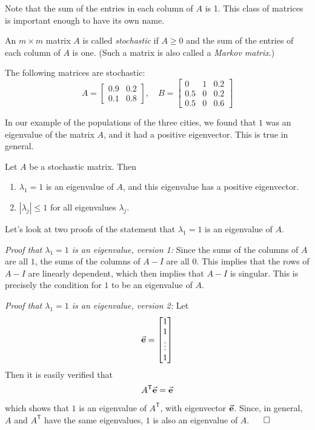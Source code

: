 Note that the sum of the entries in each column of $A$ is 1.
This class of matrices is important enough to have its own name.
\begin{definition}
An $m\times m$ matrix $A$ is called \emph{stochastic}
if $A \ge 0$ and the sum of the entries
of each column of $A$ is one.
(Such a matrix is also called a \emph{Markov matrix}.)
\end{definition}
\begin{xexample}
The following matrices are stochastic:
\begin{equation}
  A = \begin{bmatrix}
          0.9 & 0.2 \\ 0.1 & 0.8
      \end{bmatrix},
  \quad
  B = \begin{bmatrix}
          0 & 1 & 0.2 \\ 0.5 & 0 & 0.2 \\ 0.5 & 0 & 0.6
      \end{bmatrix}
\label{eqn:stoch:examples}
\end{equation}
\end{xexample}
In our example of the populations of the three cities,
we found that $1$ was an eigenvalue of the matrix $A$, and it
had a positive eigenvector.  This is true in general.
\begin{theorem}
Let $A$ be a stochastic matrix. Then
\begin{enumerate}
\item $\lambda_1 = 1$ is an eigenvalue of $A$,
and this eigenvalue has a positive eigenvector.
\item $|\lambda_j| \le 1$ for all eigenvalues $\lambda_j$.
\end{enumerate}
\end{theorem}
%
Let's look at two proofs of the statement that
$\lambda_1=1$ is an eigenvalue of $A$.

\emph{Proof that $\lambda_1=1$ is an eigenvalue, version 1:}
Since the sums of the columns of $A$ are all $1$,
the sums of the columns of $A-I$ are all $0$.
This implies that the rows of $A-I$ are linearly
dependent, which then implies that
$A-I$ is singular.  This is precisely the condition
for $1$ to be an eigenvalue of $A$.

\emph{Proof that $\lambda_1=1$ is an eigenvalue, version 2:}
Let
\begin{equation}
   \vec{\textbf{e}} = \begin{bmatrix} 1 \\ 1 \\ \vdots \\ 1\end{bmatrix}
\end{equation}
Then it is easily verified that
\begin{equation}
  A^{\textsf{T}}\vec{\textbf{e}} = \vec{\textbf{e}}
\end{equation}
which shows that $1$ is an eigenvalue of $A^{\textsf{T}}$, with
eigenvector $\vec{\textbf{e}}$.
Since, in general, $A$ and $A^{\textsf{T}}$ have the
same eigenvalues, $1$ is also an eigenvalue of $A$.
\hfill $\qed$

